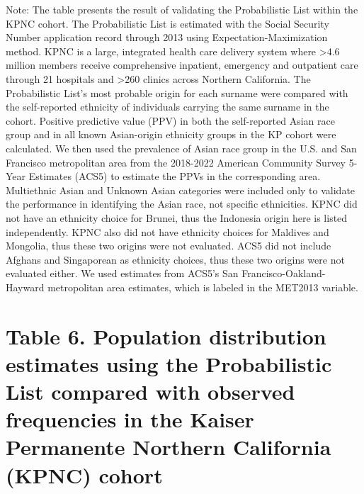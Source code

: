 \documentclass[
  landscape]{article}
\begin{document}
\begin{table}[!h]
\begin{threeparttable}
\begin{tabular}[t]
\bottomrule
\end{tabular}
\begin{tablenotes}
\small
\item [] Note: The table presents the result of validating the Probabilistic List within the KPNC cohort. The Probabilistic List is estimated with the Social Security Number application record through 2013 using Expectation-Maximization method. KPNC is a large, integrated health care delivery system where >4.6 million members receive comprehensive inpatient, emergency and outpatient care through 21 hospitals and >260 clinics across Northern California. The Probabilistic List’s most probable origin for each surname were compared with the self-reported ethnicity of individuals carrying the same surname in the cohort. Positive predictive value (PPV) in both the self-reported Asian race group and in all known Asian-origin ethnicity groups in the KP cohort were calculated. We then used the prevalence of Asian race group in the U.S. and San Francisco metropolitan area from the 2018-2022 American Community Survey 5-Year Estimates (ACS5) to estimate the PPVs in the corresponding area. Multiethnic Asian and Unknown Asian categories were included only to validate the performance in identifying the Asian race, not specific ethnicities. KPNC did not have an ethnicity choice for Brunei, thus the Indonesia origin here is listed independently. KPNC also did not have ethnicity choices for Maldives and Mongolia, thus these two origins were not evaluated. ACS5 did not include Afghans and Singaporean as ethnicity choices, thus these two origins were not evaluated either. We used estimates from ACS5’s San Francisco-Oakland-Hayward metropolitan area estimates, which is labeled in the MET2013 variable.
\end{tablenotes}
\end{threeparttable}
\end{table}

\eject \pdfpagewidth=420mm \pdfpageheight=297mm \newpage

\hypertarget{table-6.-population-distribution-estimates-using-the-probabilistic-list-compared-with-observed-frequencies-in-the-kaiser-permanente-northern-california-kpnc-cohort}{%
\section{Table 6. Population distribution estimates using the
Probabilistic List compared with observed frequencies in the Kaiser
Permanente Northern California (KPNC)
cohort}\label{table-6.-population-distribution-estimates-using-the-probabilistic-list-compared-with-observed-frequencies-in-the-kaiser-permanente-northern-california-kpnc-cohort}}
\end{document}
